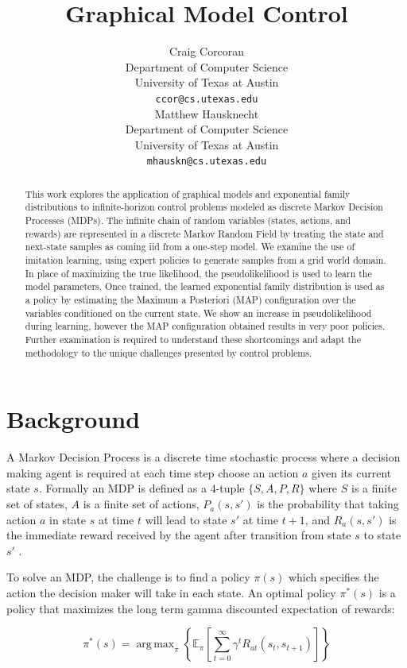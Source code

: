 \documentclass{article} %
\title{Graphical Model Control}
\author{
Craig Corcoran\\
Department of Computer Science\\
University of Texas at Austin\\
\texttt{ccor@cs.utexas.edu} \\
\And
Matthew Hausknecht\\
Department of Computer Science\\
University of Texas at Austin\\
\texttt{mhauskn@cs.utexas.edu} \\
}
\DeclareMathOperator*{\argmax}{arg\,max}
\begin{document}
\maketitle

\begin{abstract}
This work explores the application of graphical models and exponential family
distributions to infinite-horizon control problems modeled as discrete Markov 
Decision Processes (MDPs). The infinite chain of random variables (states, 
actions, and rewards) are represented in a discrete Markov Random Field by 
treating the state and next-state samples as coming iid from a one-step model.
We examine the use of imitation learning, using expert policies to
generate samples from a grid world domain. In place of maximizing the true 
likelihood, the pseudolikelihood is used to learn the model parameters. 
Once trained, the learned exponential family distribution is used as a
policy by estimating the Maximum a Posteriori (MAP) configuration over the
variables conditioned on the current state.  We show an increase in
pseudolikelihood during learning, however the MAP configuration obtained
results in very poor policies. Further examination is required to understand
these shortcomings and adapt the methodology to the unique challenges presented
by control problems. \end{abstract}

\section{Background}
A Markov Decision Process is a discrete time stochastic process where a
decision making agent is required at each time step choose an action $a$ given
its current state $s$. Formally an MDP is defined as a 4-tuple $\{S,A,P,R\}$
where $S$ is a finite set of states, $A$ is a finite set of actions,
$P_a(s,s')$ is the probability that taking action $a$ in state $s$ at time $t$
will lead to state $s'$ at time $t+1$, and $R_a(s,s')$ is the immediate reward
received by the agent after transition from state $s$ to state $s'$
\cite{bellman57}.

To solve an MDP, the challenge is to find a policy $\pi(s)$ which specifies the
action the decision maker will take in each state. An optimal policy $\pi^*(s)$
is a policy that maximizes the long term gamma discounted expectation of
rewards:

\begin{equation}
\label{eqn:opt-policy}
\pi^*(s) = \argmax_\pi \left\{\mathbb{E}_\pi\left[\sum_{t=0}^{\infty} \gamma^tR_{at}(s_t,s_{t+1})\right] \right\}
\end{equation}
\end{document}
